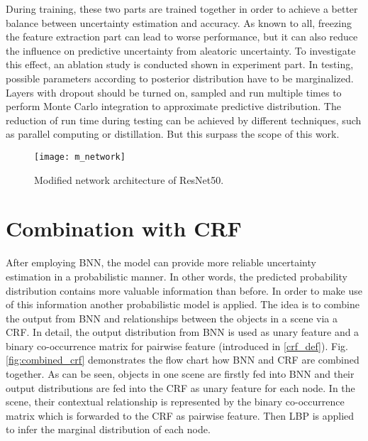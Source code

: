 During training, these two parts are trained together in order to achieve a better balance between uncertainty estimation and accuracy.
As known to all, freezing the feature extraction part can lead to worse performance, but it can also reduce the influence on predictive uncertainty from aleatoric uncertainty.
To investigate this effect, an ablation study is conducted shown in experiment part.
In testing, possible parameters according to posterior distribution have to be marginalized.
Layers with dropout should be turned on, sampled and run multiple times to perform Monte Carlo integration to approximate predictive distribution.
The reduction of run time during testing can be achieved by different techniques, such as parallel computing or distillation.
But this surpass the scope of this work.
\begin{figure}[H]
	\begin{center}
		\texttt{[image: m\_network]}
		\caption{Modified network architecture of ResNet50.}		
		\label{fig:modified_net}
	\end{center}
\end{figure}

\section{Combination with CRF}\label{com_crf}
After employing \gls{BNN}, the model can provide more reliable uncertainty estimation in a probabilistic manner.
In other words, the predicted probability distribution contains more valuable information than before.
In order to make use of this information another probabilistic model is applied.
The idea is to combine the output from \gls{BNN} and relationships between the objects in a scene via a \gls{CRF}.
In detail, the output distribution from \gls{BNN} is used as unary feature and a binary co-occurrence matrix for pairwise feature (introduced in \ref{crf_def}). 
Fig.\ref{fig:combined_crf} demonstrates the flow chart how \gls{BNN} and \gls{CRF} are combined together.
As can be seen, objects in one scene are firstly fed into \gls{BNN} and their output distributions are fed into the \gls{CRF} as unary feature for each node.
In the scene, their contextual relationship is represented by the binary co-occurrence matrix which is forwarded to the \gls{CRF} as pairwise feature.
Then \gls{LBP} is applied to infer the marginal distribution of each node.

